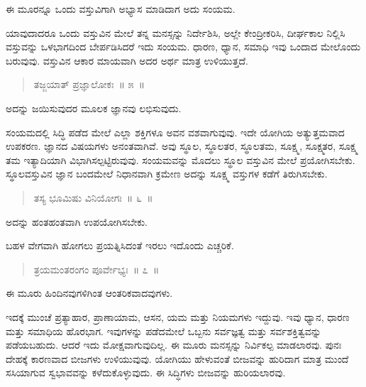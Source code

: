 ಈ ಮೂರನ್ನೂ ಒಂದು ವಸ್ತುವಿಗಾಗಿ ಅಭ್ಯಾಸ ಮಾಡಿದಾಗ ಅದು ಸಂಯಮ. 

ಯಾವುದಾದರೂ ಒಂದು ವಸ್ತುವಿನ ಮೇಲೆ ತನ್ನ ಮನಸ್ಸನ್ನು ನಿರ್ದೇಶಿಸಿ, ಅಲ್ಲೇ ಕೇಂದ್ರೀಕರಿಸಿ, ದೀರ್ಘಕಾಲ ನಿಲ್ಲಿಸಿ ವಸ್ತುವನ್ನು ಒಳಭಾಗದಿಂದ ಬೇರ್ಪಡಿಸಿದರೆ ಇದು ಸಂಯಮ. ಧಾರಣ, ಧ್ಯಾನ, ಸಮಾಧಿ ಇವು ಒಂದಾದ ಮೇಲೊಂದು ಬರುವುವು. ವಸ್ತುವಿನ ಆಕಾರ ಮಾಯವಾಗಿ ಅದರ ಅರ್ಥ ಮಾತ್ರ ಉಳಿಯುತ್ತದೆ. 

\vspace{-0.36cm}

\begin{verse}
ತಜ್ಜಯಾತ್​ ಪ್ರಜ್ಞಾಲೋಕಃ~॥ ೫~॥
\end{verse}

\vspace{-0.4cm}

ಅದನ್ನು ಜಯಿಸುವುದರ ಮೂಲಕ ಜ್ಞಾನವು ಲಭಿಸುವುದು. 

ಸಂಯಮದಲ್ಲಿ ಸಿದ್ಧಿ ಪಡೆದ ಮೇಲೆ ಎಲ್ಲಾ ಶಕ್ತಿಗಳೂ ಅವನ ವಶವಾಗುವುವು. ಇದೇ ಯೋಗಿಯ ಅತ್ಯುತ್ತಮವಾದ ಉಪಕರಣ. ಜ್ಞಾನದ ವಿಷಯಗಳು ಅನಂತವಾಗಿವೆ. ಅವು ಸ್ಥೂಲ, ಸ್ಥೂಲತರ, ಸ್ಥೂಲತಮ, ಸೂಕ್ಷ್ಮ, ಸೂಕ್ಷ್ಮತರ, ಸೂಕ್ಷ್ಮ ತಮ ಇತ್ಯಾದಿಯಾಗಿ ವಿಭಾಗಿಸಲ್ಪಟ್ಟಿರುವುವು. ಸಂಯಮವನ್ನು ಮೊದಲು ಸ್ಥೂಲ ವಸ್ತುವಿನ ಮೇಲೆ ಪ್ರಯೋಗಿಸಬೇಕು. ಸ್ಥೂಲವಸ್ತುವಿನ ಜ್ಞಾನ ಬಂದಮೇಲೆ ನಿಧಾನವಾಗಿ ಕ್ರಮೇಣ ಅದನ್ನು ಸೂಕ್ಷ್ಮ ವಸ್ತುಗಳ ಕಡೆಗೆ ತಿರುಗಿಸಬೇಕು. 

\vspace{-0.3cm}

\begin{verse}
ತಸ್ಯ ಭೂಮಿಷು ವಿನಿಯೋಗಃ~॥ ೬~॥
\end{verse}

\vspace{-0.3cm}

ಅದನ್ನು ಹಂತಹಂತವಾಗಿ ಉಪಯೋಗಿಸಬೇಕು. 

ಬಹಳ ವೇಗವಾಗಿ ಹೋಗಲು ಪ್ರಯತ್ನಿಸಿದಂತೆ ಇರಲು ಇದೊಂದು ಎಚ್ಚರಿಕೆ. 

\vspace{-0.3cm}

\begin{verse}
ತ್ರಯಮಂತರಂಗಂ ಪೂರ್ವೇಭ್ಯಃ~॥ ೭~॥
\end{verse}

\vspace{-0.3cm}

ಈ ಮೂರು ಹಿಂದಿನವುಗಳಿಗಿಂತ ಆಂತರಿಕವಾದವುಗಳು. 

ಇದಕ್ಕೆ ಮುಂಚೆ ಪ್ರತ್ಯಾಹಾರ, ಪ್ರಾಣಾಯಾಮ, ಆಸನ, ಯಮ ಮತ್ತು ನಿಯಮಗಳು ಇದ್ದುವು. ಇವು ಧ್ಯಾನ, ಧಾರಣ ಮತ್ತು ಸಮಾಧಿಯ ಹೊರಭಾಗ. ಇವುಗಳನ್ನು ಪಡೆದಮೇಲೆ ಒಬ್ಬನು ಸರ್ವಜ್ಞತ್ವ ಮತ್ತು ಸರ್ವಶಕ್ತಿತ್ವವನ್ನು ಪಡೆಯಬಹುದು. ಆದರೆ ಇದು ಮೋಕ್ಷವಾಗುವುದಿಲ್ಲ. ಈ ಮೂರು ಮನಸ್ಸನ್ನು ನಿರ್ವಿಕಲ್ಪ ಮಾಡಲಾರವು. ಪುನಃ ದೇಹಕ್ಕೆ ಕಾರಣವಾದ ಬೀಜಗಳು ಉಳಿಯುವುವು. ಯೋಗಿಯು ಹೇಳುವಂತೆ ಬೀಜವನ್ನು ಹುರಿದಾಗ ಮಾತ್ರ ಮುಂದೆ ಸಸಿಯಾಗುವ ಸ್ವಭಾವವನ್ನು ಕಳೆದುಕೊಳ್ಳುವುದು. ಈ ಸಿದ್ಧಿಗಳು ಬೀಜವನ್ನು ಹುರಿಯಲಾರವು. 


